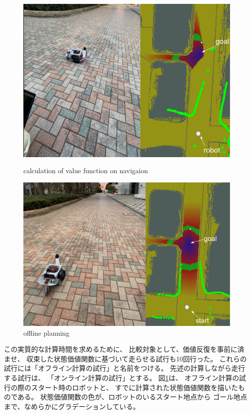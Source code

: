 \documentclass{jarticle}
\begin{document}
\begin{figure}[bt]
  \centering
   \includegraphics[width=1.0\linewidth]{./figs/raspicat-online.png}
   \caption{calculation of value function on navigaion}
	\label{fig:raspicat-no-local}
	\vspace{1em}
   \includegraphics[width=1.0\linewidth]{./figs/raspicat-offline.png}
   \caption{offline planning}
	\label{fig:raspicat-after-planning}
\end{figure}


この実質的な計算時間を求めるために、
比較対象として、価値反復を事前に済ませ、
収束した状態価値関数に基づいて走らせる試行も10回行った。
これらの試行には「オフライン計算の試行」と名前をつける。
先述の計算しながら走行する試行は、
「オンライン計算の試行」とする。
図\ref{fig:raspicat-after-planning}は、
オフライン計算の試行の際のスタート時のロボットと、
すでに計算された状態価値関数を描いたものである。
状態価値関数の色が、ロボットのいるスタート地点から
ゴール地点まで、なめらかにグラデーションしている。
\end{document}
